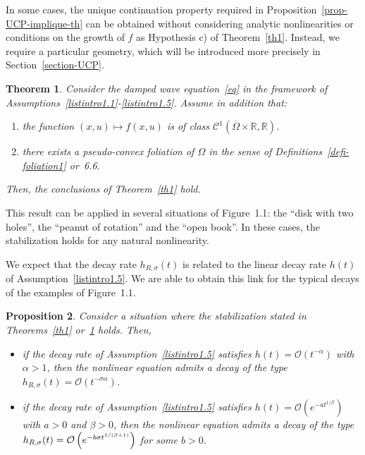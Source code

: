 \documentclass[11pt]{article}
\newtheorem{theo}{Theorem}[section]
\newtheorem{prop}[theo]{Proposition}
\theoremstyle{definition}
\numberwithin{equation}{section}
\numberwithin{figure}{section}
\numberwithin{table}{section}
\newcommand{\RR}{\mathbb{R}}
\newcommand{\Cc}{\mathcal{C}}
\newcommand{\Oc}{\mathcal{O}}
\newcommand*{\alphenumi}{\renewcommand*{\theenumi}{\alph{enumi}}}
\begin{document}
In some cases, the unique continuation property required in Proposition~\ref{prop-UCP-implique-th} can be obtained without considering analytic nonlinearities or conditions on the growth of $f$ as Hypothesis c) of Theorem~\ref{th1}. Instead, we require a particular geometry, which will be introduced more precisely in Section~\ref{section-UCP}.
\goodbreak

\begin{theo}\label{th2}
Consider the damped wave equation~\eqref{eq} in the framework of Assumptions~\eqref{listintro1.1}-\eqref{listintro1.5}. Assume in addition that:
\begin{enumerate}\alphenumi
\item \label{listtheo1.2.1}the function $(x,u)\mapsto f(x,u)$ is of class $\Cc^1\left(\overline{\Omega}\times \RR,\RR\right)$.
\item \label{listtheo1.2.2}there exists a pseudo-convex foliation of $\Omega$ in the sense of Definitions~\ref{defi-foliation1} or~6.6.
\end{enumerate}
Then, the conclusions of Theorem~\ref{th1} hold.
\end{theo}

This result can be applied in several situations of Figure~1.1: the ``disk with two holes'', the ``peanut of rotation'' and the ``open book''. In these cases, the stabilization holds for any natural nonlinearity.

We expect that the decay rate $h_{R,\sigma}(t)$ is related to the linear decay rate $h(t)$ of Assumption~\eqref{listintro1.5}. We are able to obtain this link for the typical decays of the examples of Figure~1.1.

\begin{prop}\label{prop1}
Consider a situation where the stabilization stated in Theorems~\ref{th1} or~\ref{th2} holds. Then,
\begin{itemize}
\item if the decay rate of Assumption~\eqref{listintro1.5} satisfies $h(t)=\Oc({t^{-\alpha}})$ with $\alpha>1$, then the nonlinear equation admits a decay of the type $h_{R,\sigma}(t)= \Oc (t^{-\sigma\alpha})$.
\item if the decay rate of Assumption~\eqref{listintro1.5} satisfies $h(t)=\Oc \left(e^{-a {t^{1/\beta}}}\right)$ with $a>0$ and $\beta>0$, then the nonlinear equation admits a decay of the type $h_{R,\sigma}(t)\linebreak= \Oc \left(e^{-b\sigma t^{1/(\beta+1)}}\right)$ for some $b>0$.
\end{itemize}
\end{prop}
\end{document}
